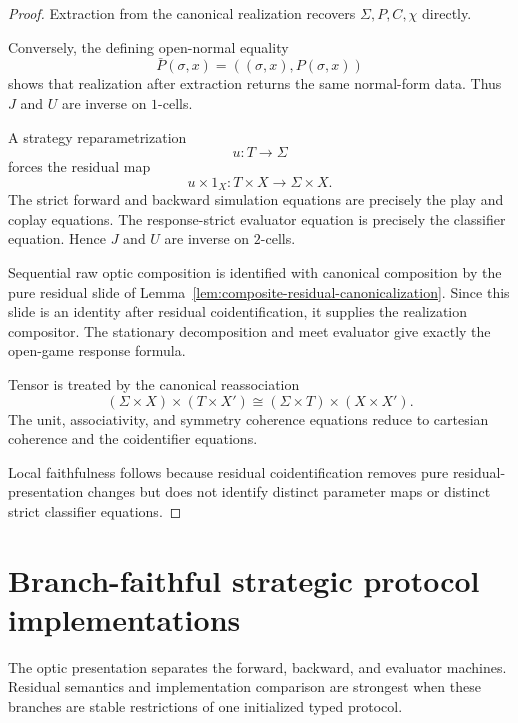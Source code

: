 \begin{proof}
Extraction from the canonical realization recovers \(\Sigma,P,C,\chi\) directly.

Conversely, the defining open-normal equality
\[
  \bar P(\sigma,x)
  =
  ((\sigma,x),P(\sigma,x))
\]
shows that realization after extraction returns the same normal-form data. Thus \(J\) and \(U\) are
inverse on \(1\)-cells.

A strategy reparametrization
\[
  u:T\to\Sigma
\]
forces the residual map
\[
  u\times1_X:T\times X\to\Sigma\times X.
\]
The strict forward and backward simulation equations are precisely the play and coplay equations.
The response-strict evaluator equation is precisely the classifier equation. Hence \(J\) and \(U\)
are inverse on \(2\)-cells.

Sequential raw optic composition is identified with canonical composition by the pure residual slide
of Lemma~\ref{lem:composite-residual-canonicalization}. Since this slide is an identity after
residual coidentification, it supplies the realization compositor. The stationary decomposition and
meet evaluator give exactly the open-game response formula.

Tensor is treated by the canonical reassociation
\[
  (\Sigma\times X)\times(T\times X')
  \cong
  (\Sigma\times T)\times(X\times X').
\]
The unit, associativity, and symmetry coherence equations reduce to cartesian coherence and the
coidentifier equations.

Local faithfulness follows because residual coidentification removes pure residual-presentation
changes but does not identify distinct parameter maps or distinct strict classifier equations.
\end{proof}

\section{Branch-faithful strategic protocol implementations}
\label{sec:branch-faithful-protocols}

The optic presentation separates the forward, backward, and evaluator machines. Residual semantics
and implementation comparison are strongest when these branches are stable restrictions of one
initialized typed protocol.

